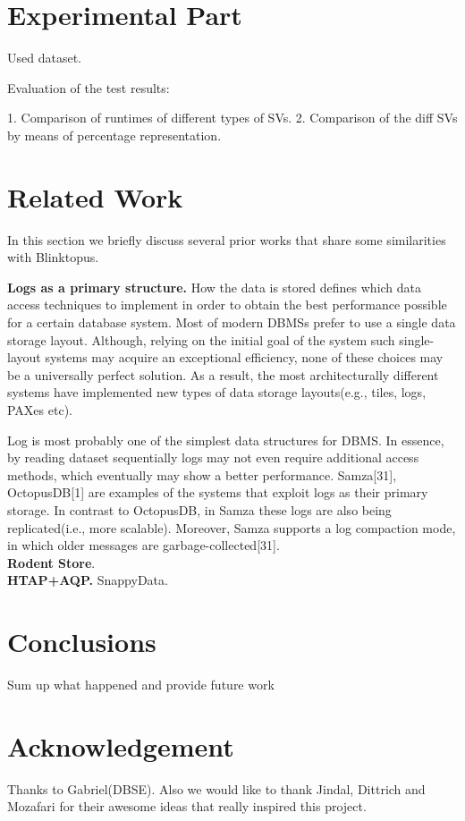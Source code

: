\documentclass[10pt, conference, compsocconf]{IEEEtran}
\begin{document}
\section{Experimental Part}

Used dataset.

Evaluation of the test results:
 
1. Comparison of runtimes of different types of SVs.
2. Comparison of the diff SVs by means of percentage representation.

\section{Related Work}
In this section we briefly discuss several prior works that share some similarities with Blinktopus.

\textbf{Logs as a primary structure.} How the data is stored defines which data access techniques to implement in order to obtain the best performance possible for a certain database system. Most of modern DBMSs prefer to use a single data storage layout. Although, relying on the initial goal of the system such single-layout systems may acquire an exceptional efficiency, none of these choices may be a universally perfect solution. As a result, the most architecturally different systems have implemented new types of data storage layouts(e.g., tiles, logs, PAXes etc). 

Log is most probably one of the simplest data structures for DBMS. In essence, by reading dataset sequentially logs may not even require additional access methods, which eventually may show a better performance. Samza[31], OctopusDB[1] are examples of the systems that exploit logs as their primary storage. In contrast to OctopusDB, in Samza these logs are also being replicated(i.e., more scalable). Moreover, Samza supports a log compaction mode, in which older messages are garbage-collected[31].\\
\textbf{Rodent Store}.\\
\textbf{HTAP+AQP.} SnappyData.\\


\section{Conclusions}
Sum up what happened and provide future work

\section*{Acknowledgement}
Thanks to Gabriel(DBSE). Also we would like to thank Jindal, Dittrich and Mozafari for their awesome ideas that really inspired this project.
\end{document}
